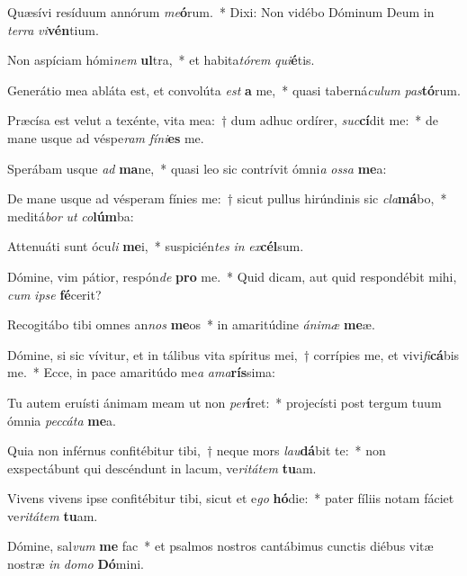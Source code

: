 \item Quæsívi resíduum annórum \textit{me}\textbf{ó}rum.~* Dixi: Non vidébo Dóminum Deum in \textit{ter}\textit{ra} \textit{vi}\textbf{vén}tium.
\item Non aspíciam hómi\textit{nem} \textbf{ul}tra,~* et habita\textit{tó}\textit{rem} \textit{qui}\textbf{é}tis.
\item Generátio mea abláta est, et convolúta \textit{est} \textbf{a} me,~* quasi taberná\textit{cu}\textit{lum} \textit{pas}\textbf{tó}rum.
\item Præcísa est velut a texénte, vita mea:~† dum adhuc ordírer, \textit{suc}\textbf{cí}dit me:~* de mane usque ad véspe\textit{ram} \textit{fí}\textit{ni}\textbf{es} me.
\item Sperábam usque \textit{ad} \textbf{ma}ne,~* quasi leo sic contrívit ómni\textit{a} \textit{os}\textit{sa} \textbf{me}a:
\item De mane usque ad vésperam fínies me:~† sicut pullus hirúndinis sic \textit{cla}\textbf{má}bo,~* meditá\textit{bor} \textit{ut} \textit{co}\textbf{lúm}ba:
\item Attenuáti sunt ócu\textit{li} \textbf{me}i,~* suspicién\textit{tes} \textit{in} \textit{ex}\textbf{cél}sum.
\item Dómine, vim pátior, respón\textit{de} \textbf{pro} me.~* Quid dicam, aut quid respondébit mihi, \textit{cum} \textit{ip}\textit{se} \textbf{fé}cerit?
\item Recogitábo tibi omnes an\textit{nos} \textbf{me}os~* in amaritúdine \textit{á}\textit{ni}\textit{mæ} \textbf{me}æ.
\item Dómine, si sic vívitur, et in tálibus vita spíritus mei,~† corrípies me, et vivi\textit{fi}\textbf{cá}bis me.~* Ecce, in pace amaritúdo me\textit{a} \textit{a}\textit{ma}\textbf{rís}sima:
\item Tu autem eruísti ánimam meam ut non \textit{per}\textbf{í}ret:~* projecísti post tergum tuum ómnia \textit{pec}\textit{cá}\textit{ta} \textbf{me}a.
\item Quia non inférnus confitébitur tibi,~† neque mors \textit{lau}\textbf{dá}bit te:~* non exspectábunt qui descéndunt in lacum, ve\textit{ri}\textit{tá}\textit{tem} \textbf{tu}am.
\item Vivens vivens ipse confitébitur tibi, sicut et e\textit{go} \textbf{hó}die:~* pater fíliis notam fáciet ve\textit{ri}\textit{tá}\textit{tem} \textbf{tu}am.
\item Dómine, sal\textit{vum} \textbf{me} fac~* et psalmos nostros cantábimus cunctis diébus vitæ nostræ \textit{in} \textit{do}\textit{mo} \textbf{Dó}mini.
